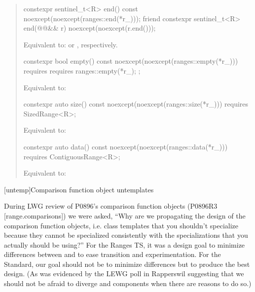 \begin{itemize}
\begin{quote}
\begin{itemdecl}
constexpr sentinel_t<R> end() const
  noexcept(noexcept(ranges::end(*r_)));
friend constexpr sentinel_t<R> end(@@&& r)
  noexcept(noexcept(r.end()));
\end{itemdecl}

\begin{itemdescr}
\pnum
\effects Equivalent to: 
or , respectively.
\end{itemdescr}

\begin{itemdecl}
constexpr bool empty() const
  noexcept(noexcept(ranges::empty(*r_)))
  requires requires { ranges::empty(*r_); };
\end{itemdecl}

\begin{itemdescr}
\pnum
\effects Equivalent to: 
\end{itemdescr}

\begin{itemdecl}
constexpr auto size() const
  noexcept(noexcept(ranges::size(*r_)))
  requires SizedRange<R>;
\end{itemdecl}

\begin{itemdescr}
\pnum
\effects Equivalent to: 
\end{itemdescr}

\begin{itemdecl}
constexpr auto data() const
  noexcept(noexcept(ranges::data(*r_)))
  requires ContiguousRange<R>;
\end{itemdecl}

\begin{itemdescr}
\pnum
\effects Equivalent to: 
\end{itemdescr}
  \end{quote}
\end{itemize}


[untemp]{Comparison function object untemplates}

During LWG review of P0896's comparison function objects
(P0896R3 [range.comparisons]) we were asked, ``Why are we propagating the design
of the  comparison function objects, i.e. class templates that you
shouldn't specialize because they cannot be specialized consistently with the
 specializations that you actually should be using?'' For the Ranges
TS, it was a design goal to minimize differences between  and
 to ease transition and experimentation. For the Standard, our
goal should not be to minimize differences but to produce the best design. (As
was evidenced by the LEWG poll in Rapperswil suggesting that we should not be
afraid to diverge  and  components when there are reasons
to do so.)

